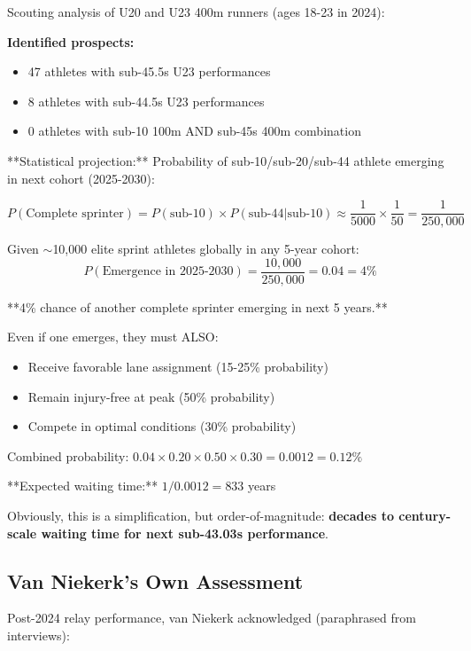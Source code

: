 Scouting analysis of U20 and U23 400m runners (ages 18-23 in 2024):

\textbf{Identified prospects:}
\begin{itemize}
    \item 47 athletes with sub-45.5s U23 performances
    \item 8 athletes with sub-44.5s U23 performances
    \item 0 athletes with sub-10 100m AND sub-45s 400m combination
\end{itemize}

**Statistical projection:** Probability of sub-10/sub-20/sub-44 athlete emerging in next cohort (2025-2030):

\begin{equation}
P(\text{Complete sprinter}) = P(\text{sub-10}) \times P(\text{sub-44} | \text{sub-10}) \approx \frac{1}{5000} \times \frac{1}{50} = \frac{1}{250,000}
\end{equation}

Given $\sim$10,000 elite sprint athletes globally in any 5-year cohort:
\begin{equation}
P(\text{Emergence in 2025-2030}) = \frac{10,000}{250,000} = 0.04 = 4\%
\end{equation}

**4\% chance of another complete sprinter emerging in next 5 years.**

Even if one emerges, they must ALSO:
\begin{itemize}
    \item Receive favorable lane assignment (15-25\% probability)
    \item Remain injury-free at peak (50\% probability)
    \item Compete in optimal conditions (30\% probability)
\end{itemize}

Combined probability: $0.04 \times 0.20 \times 0.50 \times 0.30 = 0.0012 = 0.12\%$

**Expected waiting time:** $1 / 0.0012 = 833$ years

Obviously, this is a simplification, but order-of-magnitude: \textbf{decades to century-scale waiting time for next sub-43.03s performance}.

\subsection{Van Niekerk's Own Assessment}

Post-2024 relay performance, van Niekerk acknowledged (paraphrased from interviews):

